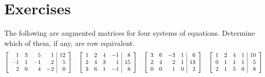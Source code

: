 \section*{Exercises}

\begin{enumialphparenastyle}

\begin{ex}
  The following are augmented matrices for four systems of
  equations. Determine which of them, if any, are row equivalent.
  \begin{equation*}
    \left[
    \begin{array}{rrrr|r}
       1 & 3 &  5 &  1 & 12 \\
      -1 & 1 & -1 &  2 &  5 \\
       2 & 0 &  4 & -2 &  0
    \end{array}
    \right]
    \quad
    \left[
    \begin{array}{rrrr|r}
      1 & 2 & 4 & -1 &  8 \\
      2 & 4 & 3 &  1 & 15 \\
      3 & 6 & 1 & -1 &  8
    \end{array}
    \right]
    \quad
    \left[
    \begin{array}{rrrr|r}
      3 & 6 & -3 & 1 & 6 \\
      2 & 4 & 2 & 1 & 13 \\
      0 & 0 & 1 & 0 & 2
    \end{array}
    \right]
    \quad
    \left[
    \begin{array}{rrrr|r}
      1 & 2 & 4 & 1 & 10 \\
      0 & 1 & 1 & 1 & 5 \\
      2 & 1 & 5 & 0 & 8
    \end{array}
    \right]
  \end{equation*}

  

\end{ex}
\end{enumialphparenastyle}
